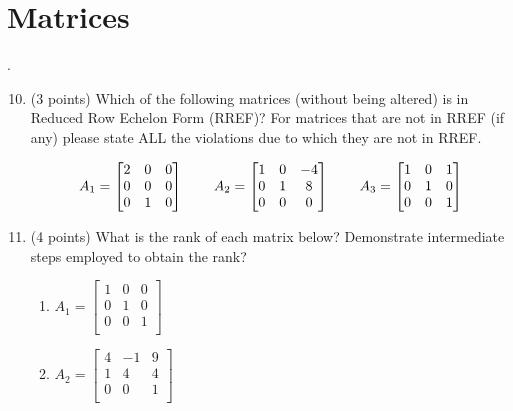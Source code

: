 \documentclass{article}%
\begin{document}
\section*{Matrices}.
\begin{enumerate}
    \setcounter{enumi}{9}
    \item (3 points) Which of the following matrices (without being altered) is in Reduced Row Echelon Form (RREF)? For matrices that are not in RREF (if any) please state ALL the violations due to which they are not in RREF.\vspace{1ex}

    \begin{gather*}
        A_1 = 
        \begin{bmatrix}
            2 & 0 & 0\\
            0 & 0 & 0\\
            0 & 1 & 0\\
        \end{bmatrix}
        \hspace{5ex}
        A_2 =
        \begin{bmatrix}
            1 & 0 & -4\\
            0 & 1 & 8\\
            0 & 0 & 0\\
        \end{bmatrix}
        \hspace{5ex}
        A_3 =
        \begin{bmatrix}
            1 & 0 & 1\\
            0 & 1 & 0\\
            0 & 0 & 1\\
        \end{bmatrix}
    \end{gather*}



    \item (4 points) What is the rank of each matrix below? Demonstrate intermediate steps employed to obtain the rank?
    \begin{enumerate}
        \item $A_1 =\begin{bmatrix}
            1 & 0 & 0\\
            0 & 1 & 0\\
            0 & 0 & 1\\
           \end{bmatrix}$
        \item $A_2 =\begin{bmatrix}
            4 & -1 & 9\\
            1 & 4 & 4\\
            0 & 0 & 1\\
           \end{bmatrix}$
    \end{enumerate}

    
\end{enumerate}
\end{document}
